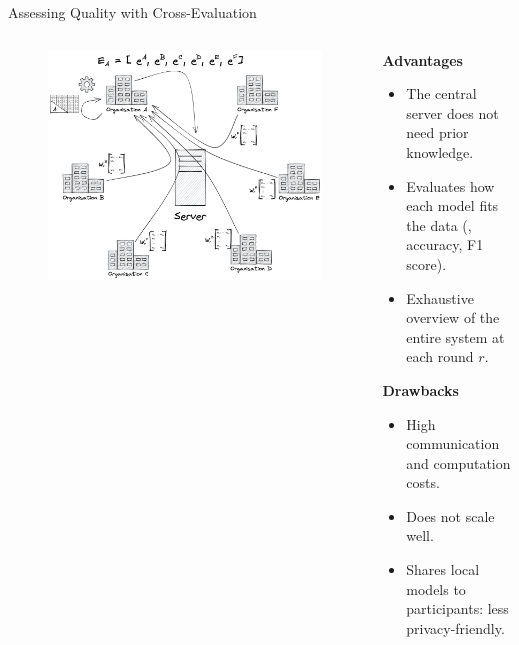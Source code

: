 \begin{frame}{Assessing Quality with Cross-Evaluation}

  \begin{columns}
    \begin{column}{.45\textwidth}
      \begin{figure}
        \centering
        \includegraphics[width=\textwidth]{figures/radar/xeval}
      \end{figure}
    \end{column}
    
    \begin{column}{.55\textwidth}
      \small
      \setlength{\baselineskip}{0.8\baselineskip}
      \vspace{1ex}

      \textbf{Advantages}
      \begin{itemize}
        \item The central server does not need prior knowledge.
        \item Evaluates how each model fits the data (\eg, accuracy, F1 score).
        \item Exhaustive overview of the entire system at each round $r$.
      \end{itemize}

      \pause
      \textbf{Drawbacks}
      \begin{itemize}
        \item High communication and computation costs.
        \item Does not scale well.
        \item Shares local models to participants: less privacy-friendly.
      \end{itemize}



\end{column}
\end{columns}
\end{frame}
